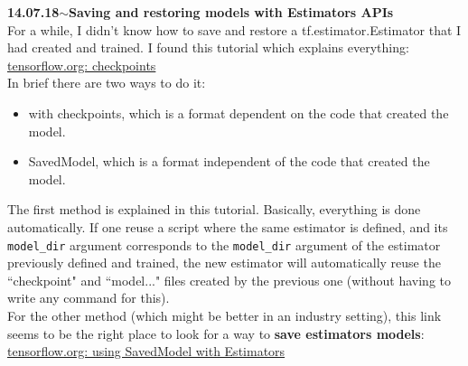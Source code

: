 \documentclass[11pt,a4paper]{article}
\newenvironment{loggentry}[2]%
{\noindent\textbf{#1}\hspace{1cm}$\mathbf{\sim}$\text{ }\textbf{#2}\\}{\vspace{0.5cm}}
\begin{document}
\begin{loggentry}{14.07.18}{Saving and restoring models with Estimators APIs}
For a while, I didn't know how to save and restore a tf.estimator.Estimator that I had created and trained. I found this tutorial which explains everything:\\
\href{https://www.tensorflow.org/guide/checkpoints}{tensorflow.org: checkpoints}\\
In brief there are two ways to do it:
\begin{itemize}
\item with checkpoints, which is a format dependent on the code that created the model.
\item SavedModel, which is a format independent of the code that created the model.
\end{itemize}
The first method is explained in this tutorial. Basically, everything is done automatically. If one reuse a script where the same estimator is defined, and its \texttt{model\_dir} argument corresponds to the \texttt{model\_dir} argument of the estimator previously defined and trained, the new estimator will automatically reuse the ``checkpoint" and ``model..." files created by the previous one (without having to write any command for this).\\
For the other method (which might be better in an industry setting), this link seems to be the right place to look for a way to \textbf{save estimators models}:\\
\href{https://www.tensorflow.org/guide/saved_model#using_savedmodel_with_estimators}{tensorflow.org: using SavedModel with Estimators}\\
\end{loggentry}
\end{document}
